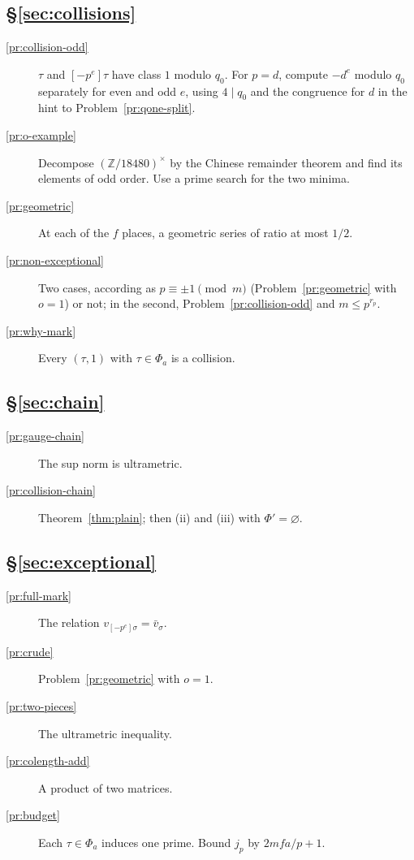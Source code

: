 \documentclass[reqno]{amsart}
\theoremstyle{definition}
\theoremstyle{plain}
\theoremstyle{definition}
\theoremstyle{remark}
\newcommand{\Z}{{\mathbb{Z}}}
\begin{document}
\subsection*{\S\ref{sec:collisions}}
\begin{description}
\item[\ref{pr:collision-odd}] \(\tau\) and \([-p^e]\tau\) have class \(1\) modulo \(q_0\).  For \(p = d\), compute \(-d^e\) modulo \(q_0\) separately for even and odd \(e\), using \(4 \mid q_0\) and the congruence for \(d\) in the hint to Problem~\ref{pr:qone-split}.
\item[\ref{pr:o-example}] Decompose \((\Z/18480)^\times\) by the Chinese remainder theorem and find its elements of odd order.  Use a prime search for the two minima.
\item[\ref{pr:geometric}] At each of the \(f\) places, a geometric series of ratio at most \(1/2\).
\item[\ref{pr:non-exceptional}] Two cases, according as \(p \equiv \pm 1 \pmod m\) (Problem~\ref{pr:geometric} with \(o = 1\)) or not; in the second, Problem~\ref{pr:collision-odd} and \(m \le p^{r_p}\).
\item[\ref{pr:why-mark}] Every \((\tau, 1)\) with \(\tau \in \Phi_a\) is a collision.
\end{description}

\subsection*{\S\ref{sec:chain}}
\begin{description}
\item[\ref{pr:gauge-chain}] The sup norm is ultrametric.
\item[\ref{pr:collision-chain}] Theorem~\ref{thm:plain}; then (ii) and (iii) with \(\Phi' = \varnothing\).
\end{description}

\subsection*{\S\ref{sec:exceptional}}
\begin{description}
\item[\ref{pr:full-mark}] The relation \(v_{[-p^e]\sigma} = \bar v_\sigma\).
\item[\ref{pr:crude}] Problem~\ref{pr:geometric} with \(o = 1\).
\item[\ref{pr:two-pieces}] The ultrametric inequality.
\item[\ref{pr:colength-add}] A product of two matrices.
\item[\ref{pr:budget}] Each \(\tau \in \Phi_a\) induces one prime.  Bound \(j_p\) by \(2mfa/p + 1\).
\end{description}
\end{document}
